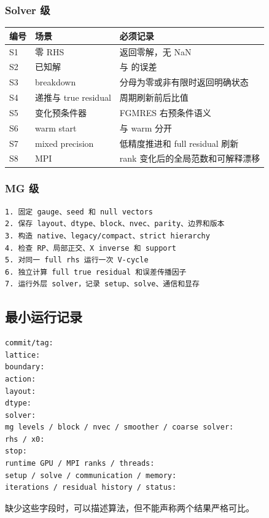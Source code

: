 \documentclass[UTF8,a4paper,10pt]{ctexart}
\DeclareRobustCommand{\pycode}[1]{\texorpdfstring{\texttt{\seqsplit{#1}}}{#1}}
\begin{document}
\subsubsection{Solver 级}
\begin{center}\small
\setlength{\tabcolsep}{2pt}
\begin{longtable}{@{}>{\raggedright\arraybackslash}p{}>{\raggedright\arraybackslash}p{}>{\raggedright\arraybackslash}p{}@{}}
\toprule
\textbf{编号} & \textbf{场景} & \textbf{必须记录} \\
\midrule\endhead
S1 & 零 RHS & 返回零解，无 NaN \\
S2 & 已知解 & 与 \pycode{x*} 的误差 \\
S3 & breakdown & 分母为零或非有限时返回明确状态 \\
S4 & 递推与 true residual & 周期刷新前后比值 \\
S5 & 变化预条件器 & FGMRES 右预条件语义 \\
S6 & warm start & \pycode{x0=0} 与 warm 分开 \\
S7 & mixed precision & 低精度推进和 full residual 刷新 \\
S8 & MPI & rank 变化后的全局范数和可解释漂移 \\
\bottomrule\end{longtable}
\end{center}
\subsubsection{MG 级}
\begin{Verbatim}[breaklines=true,breakanywhere=true,fontsize=\scriptsize]
1. 固定 gauge、seed 和 null vectors
2. 保存 layout、dtype、block、nvec、parity、边界和版本
3. 构造 native、legacy/compact、strict hierarchy
4. 检查 RP、局部正交、X inverse 和 support
5. 对同一 full rhs 运行一次 V-cycle
6. 独立计算 full true residual 和误差传播因子
7. 运行外层 solver，记录 setup、solve、通信和显存
\end{Verbatim}
\subsection{最小运行记录}
\begin{Verbatim}[breaklines=true,breakanywhere=true,fontsize=\scriptsize]
commit/tag:
lattice:
boundary:
action:
layout:
dtype:
solver:
mg levels / block / nvec / smoother / coarse solver:
rhs / x0:
stop:
runtime GPU / MPI ranks / threads:
setup / solve / communication / memory:
iterations / residual history / status:
\end{Verbatim}
缺少这些字段时，可以描述算法，但不能声称两个结果严格可比。
\end{document}
